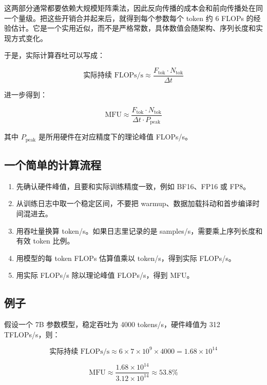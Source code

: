 \documentclass[UTF8,a4paper,11pt]{ctexart}
\begin{document}
这两部分通常都要依赖大规模矩阵乘法，因此反向传播的成本会和前向传播处在同一个量级。把这些开销合并起来后，就得到每个参数每个 token 约 $6$ FLOPs 的经验估计。它是一个实用近似，而不是严格常数，具体数值会随架构、序列长度和实现方式变化。

于是，实际计算吞吐可以写成：

\begin{equation}
\text{实际持续 FLOPs/s} \approx \frac{F_{\text{tok}} \cdot N_{\text{tok}}}{\Delta t}
\end{equation}

进一步得到：

\begin{equation}
\mathrm{MFU} \approx \frac{F_{\text{tok}} \cdot N_{\text{tok}}}{\Delta t \cdot P_{\text{peak}}}
\end{equation}

其中 $P_{\text{peak}}$ 是所用硬件在对应精度下的理论峰值 FLOPs/s。

\subsection*{一个简单的计算流程}
\begin{enumerate}
  \item 先确认硬件峰值，且要和实际训练精度一致，例如 BF16、FP16 或 FP8。
  \item 从训练日志中取一个稳定区间，不要把 warmup、数据加载抖动和首步编译时间混进去。
  \item 用吞吐量换算 token/s。如果日志里记录的是 samples/s，需要乘上序列长度和有效 token 比例。
  \item 用模型的每 token FLOPs 估算值乘以 token/s，得到实际 FLOPs/s。
  \item 用实际 FLOPs/s 除以理论峰值 FLOPs/s，得到 MFU。
\end{enumerate}

\subsection*{例子}
假设一个 7B 参数模型，稳定吞吐为 4000 tokens/s，硬件峰值为 312 TFLOPs/s，则：

\begin{equation}
\text{实际持续 FLOPs/s} \approx 6 \times 7\times 10^9 \times 4000 = 1.68 \times 10^{14}
\end{equation}

\begin{equation}
\mathrm{MFU} \approx \frac{1.68\times 10^{14}}{3.12\times 10^{14}} \approx 53.8\%
\end{equation}
\end{document}
